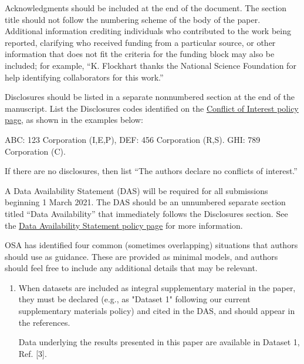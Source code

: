 \documentclass{osa-article}
\begin{document}
\begin{verbatm}
\begin{backmatter}
Acknowledgments should be included at the end of the document. The section title should not follow the numbering scheme of the body of the paper. Additional information crediting individuals who contributed to the work being reported, clarifying who received funding from a particular source, or other information that does not fit the criteria for the funding block may also be included; for example, ``K. Flockhart thanks the National Science Foundation for help identifying collaborators for this work.'' 

Disclosures should be listed in a separate nonnumbered section at the end of the manuscript. List the Disclosures codes identified on the \href{https://opg.optica.org/submit/review/data-availability-policy.cfm}{Conflict of Interest policy page}, as shown in the examples below:

\medskip

\noindent ABC: 123 Corporation (I,E,P), DEF: 456 Corporation (R,S). GHI: 789 Corporation (C).

\medskip

\noindent If there are no disclosures, then list ``The authors declare no conflicts of interest.''


A Data Availability Statement (DAS) will be required for all submissions beginning 1 March 2021. The DAS should be an unnumbered separate section titled ``Data Availability'' that
immediately follows the Disclosures section. See the \href{https://www.osapublishing.org/submit/review/data-availability-policy.cfm}{Data Availability Statement policy page} for more information.

OSA has identified four common (sometimes overlapping) situations that authors should use as guidance. These are provided as minimal models, and authors should feel free to
include any additional details that may be relevant.

\begin{enumerate}
\item When datasets are included as integral supplementary material in the paper, they must be declared (e.g., as "Dataset 1" following our current supplementary materials policy) and cited in the DAS, and should appear in the references.

 Data underlying the results presented in this paper are available in Dataset 1, Ref. [3].

\bigskip


\end{enumerate}
\end{backmatter}
\end{verbatm}
\end{document}
